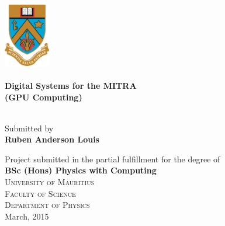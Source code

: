 \begin{titlepage}
\begin{center}
\includegraphics[width=0.15\textwidth]{img/University-of-Mauritius-logo.png}~\\[1cm]


\HRule \\[0.4cm]
{ \huge \bfseries Digital Systems for the MITRA \\[0.4cm] }
{ \LARGE \bfseries (GPU Computing) \\[0.4cm] }

\HRule \\[0.5cm]

{\Large Submitted by}\\[0.2cm]

{\LARGE \bfseries Ruben Anderson Louis \\[2.5cm]}

{\Large Project submitted in the partial fulfillment for the degree of}\\[0.5cm]

{\Large \bfseries BSc (Hons) Physics with Computing}\\[2.0cm]
 
%



\textsc{\LARGE University of Mauritius}\\[0.2cm]
\textsc{\large  Faculty of Science}\\[0.2cm]
\textsc{\large Department of Physics}\\[0.5cm]
{\Large March, 2015}
\end{center}
\clearpage
\end{titlepage}


